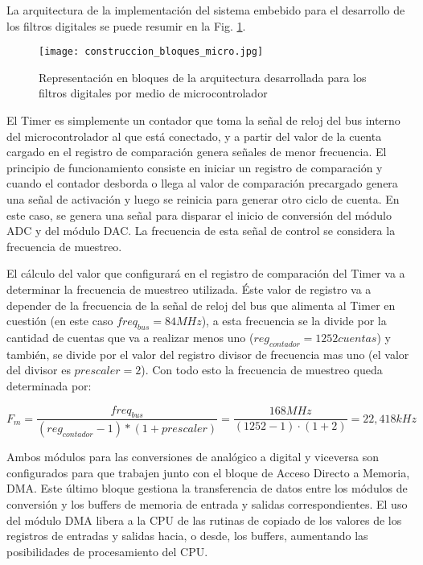 \documentclass[informe.tex]{subfiles}
\begin{document}
La arquitectura de la implementación del sistema embebido para el desarrollo de los filtros digitales se puede resumir en la Fig. \ref{fig:disenio_y_construccion:stm32:arq}.\\
\begin{figure}[h]
	\centering
	\texttt{[image: construccion\_bloques\_micro.jpg]}	
	\caption{Representación en bloques de la arquitectura desarrollada para los filtros digitales por medio de microcontrolador}
	\label{fig:disenio_y_construccion:stm32:arq}
	\end{figure}
El Timer es simplemente un contador que toma la señal de reloj del bus interno del microcontrolador al que está conectado, y a partir del valor de la cuenta cargado en el registro de comparación genera señales de menor frecuencia. El principio de funcionamiento consiste en iniciar un registro de comparación y cuando el contador desborda o llega al valor de comparación precargado genera una señal de activación y luego se reinicia para generar otro ciclo de cuenta. En este caso, se genera una señal para disparar el inicio de conversión del módulo ADC y del módulo DAC. La frecuencia de esta señal de control se considera la frecuencia de muestreo.\newline

El cálculo del valor que configurará en el registro de comparación del Timer va a determinar la frecuencia de muestreo utilizada. Éste valor de registro va a depender de la frecuencia de la señal de reloj del bus que alimenta al Timer en cuestión (en este caso $freq_{bus}=84 MHz$), a esta frecuencia se la divide por la cantidad de cuentas que va a realizar menos uno ($reg_{contador}=1252 cuentas$) y también, se divide por el valor del registro divisor de frecuencia mas uno (el valor del divisor es $prescaler=2$). Con todo esto la frecuencia de muestreo queda determinada por:
	
	$$
		F_m= \frac{freq_{bus}}
              		{(reg_{contador} -1 )*(1+prescaler)}
           =\frac{168MHz}
                 {(1252-1) \cdot (1 + 2)} 
           = 22,418 kHz
	$$

Ambos módulos para las conversiones de analógico a digital y viceversa son configurados para que trabajen junto con el bloque de Acceso Directo a Memoria, DMA. Este último bloque gestiona la transferencia de datos entre los módulos de conversión y los buffers de memoria de entrada y salidas correspondientes. El uso del módulo DMA libera a la CPU de las rutinas de copiado de los valores de los registros de entradas y salidas hacia, o desde, los buffers, aumentando las posibilidades de procesamiento del CPU.\\
\end{document}
